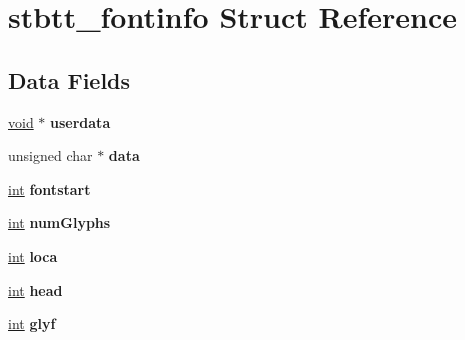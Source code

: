 \hypertarget{structstbtt__fontinfo}{}\section{stbtt\+\_\+fontinfo Struct Reference}
\label{structstbtt__fontinfo}
\subsection*{Data Fields}
\begin{DoxyCompactItemize}
\item 
\hyperlink{_s_d_l__audio_8h_a52835ae37c4bb905b903cbaf5d04b05f}{void} $\ast$ {\bfseries userdata}\hypertarget{structstbtt__fontinfo_afd0ffb02780e738d4c0a10ab833b7834}{}\label{structstbtt__fontinfo_afd0ffb02780e738d4c0a10ab833b7834}

\item 
unsigned char $\ast$ {\bfseries data}\hypertarget{structstbtt__fontinfo_ac24cea2bfcc927fd29bc74d1086707d8}{}\label{structstbtt__fontinfo_ac24cea2bfcc927fd29bc74d1086707d8}

\item 
\hyperlink{_s_d_l__thread_8h_a6a64f9be4433e4de6e2f2f548cf3c08e}{int} {\bfseries fontstart}\hypertarget{structstbtt__fontinfo_a6f06e47d895859536671c21f280546e0}{}\label{structstbtt__fontinfo_a6f06e47d895859536671c21f280546e0}

\item 
\hyperlink{_s_d_l__thread_8h_a6a64f9be4433e4de6e2f2f548cf3c08e}{int} {\bfseries num\+Glyphs}\hypertarget{structstbtt__fontinfo_a784124b1f699ba23ee3760e9998ea185}{}\label{structstbtt__fontinfo_a784124b1f699ba23ee3760e9998ea185}

\item 
\hyperlink{_s_d_l__thread_8h_a6a64f9be4433e4de6e2f2f548cf3c08e}{int} {\bfseries loca}\hypertarget{structstbtt__fontinfo_a1950b6d64d5b8e164ed4575de999b90d}{}\label{structstbtt__fontinfo_a1950b6d64d5b8e164ed4575de999b90d}

\item 
\hyperlink{_s_d_l__thread_8h_a6a64f9be4433e4de6e2f2f548cf3c08e}{int} {\bfseries head}\hypertarget{structstbtt__fontinfo_a20358970b1abaf992eb85e071e454653}{}\label{structstbtt__fontinfo_a20358970b1abaf992eb85e071e454653}

\item 
\hyperlink{_s_d_l__thread_8h_a6a64f9be4433e4de6e2f2f548cf3c08e}{int} {\bfseries glyf}\hypertarget{structstbtt__fontinfo_abab23cdf3de803bf2626ce9ac6dd834c}{}\label{structstbtt__fontinfo_abab23cdf3de803bf2626ce9ac6dd834c}


\end{DoxyCompactItemize}
